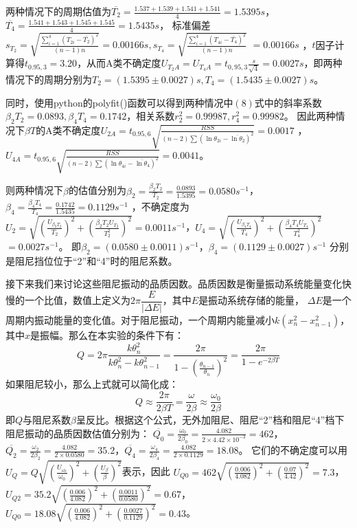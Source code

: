 \documentclass[11pt,a4paper,UTF8]{ctexart}
\begin{document}
两种情况下的周期估值为$\overline{T_{2}}=\frac{1.537+1.539+1.541+1.541}{4}=1.5395s$，$\overline{T_4}=\frac{1.541+1.543+1.545+1.545}{4}=1.5435s$，
标准偏差$s_{T_2}=\sqrt{\frac{\sum_{i=1}^{4}\left(T_{2i}-\overline{T_{2}}\right)^{2}}{(n-1)n}}=0.00166s,s_{T_4}=\sqrt{\frac{\sum_{i=1}^{4}\left(T_{4i}-\overline{T_{4}}\right)^{2}}{(n-1)n}}$ $=0.00166s$
，$t$因子计算得$t_{0.95,3}=3.20$，从而A类不确定度$U_{T_2A}=U_{T_4A}=t_{0,95,3}\frac{s}{\sqrt{4}}=0.0027s$，即两种情况下的周期分别为$T_2=(1.5395\pm0.0027)s,T_4=(1.5435\pm0.0027)s$。

同时，使用python的polyfit()函数可以得到两种情况中$(8)$式中的斜率系数$\beta_2 T_2=0.0893,\beta_4 T_4=0.1742$，相关系数$r_2^2=0.99987,r_4^2=0.99982$。
因此两种情况下$\beta T$的A类不确定度$U_{2A}=t_{0.95,6}\sqrt{\frac{RSS}{(n-2)\sum\left(\ln\theta_{2i}-\overline{\ln\theta_2}\right)^{2}}}=0.0017$
，$U_{4A}=t_{0.95,6}\sqrt{\frac{RSS}{(n-2)\sum\left(\ln\theta_{4i}-\overline{\ln\theta_4}\right)^{2}}}=0.0041$。

则两种情况下$\beta$的估值分别为$\beta_2=\frac{\beta_2 T_2}{T_2}=\frac{0.0893}{1.5395}=0.0580 s^{-1}$，$\beta_4=\frac{\beta_4 T_4}{T_4}=\frac{0.1742}{1.5435}=0.1129 s^{-1}$
，不确定度为$U_{2}=\sqrt{(\frac{U_{\beta_2 T_2}}{T_2})^2+(\frac{\beta_2 T_2U_{T_2}}{T_2^2})^2}=0.0011s^{-1}$，$U_{4}=\sqrt{(\frac{U_{\beta_4 T_4}}{T_4})^2+(\frac{\beta_4 T_4U_{T_4}}{T_4^2})^2}$ $=0.0027s^{-1}$。
即$\boxed{\beta_2=(0.0580\pm0.0011)s^{-1}}$，$\boxed{\beta_4=(0.1129\pm0.0027)s^{-1}}$ 分别是阻尼挡位位于“2”和“4”时的阻尼系数。

接下来我们来讨论这些阻尼振动的品质因数。品质因数是衡量振动系统能量变化快慢的一个比值，数值上定义为$2\pi\dfrac{E}{|\Delta E|}$，其中$E$是振动系统存储的能量，
$\Delta E$是一个周期内振动能量的变化值。对于阻尼振动，一个周期内能量减小$k(x_n^2-x_{n-1}^2)$，其中$x$是振幅。那么在本实验的条件下有：
	\[Q=2\pi\frac{k\theta_n^2}{k\theta_n^2-k\theta_{n-1}^2}=\frac{2\pi}{1-(\frac{\theta_{n-1}}{\theta_n})^2}=\frac{2\pi}{1-e^{-2\beta T}}\tag{10}\]
如果阻尼较小，那么上式就可以简化成：
	\[Q\approx\frac{2\pi}{2\beta T}=\frac{\omega}{2\beta}\approx\frac{\omega_0}{2\beta}\tag{11}\]
即$Q$与阻尼系数$\beta$呈反比。根据这个公式，无外加阻尼、阻尼“2”档和阻尼“4”档下阻尼振动的品质因数估值分别为：
$\overline{Q_0}=\frac{\omega_0}{2\beta_0}=\frac{4.082}{2\times4.42\times10^{-3}}=462$，$\overline{Q_2}=\frac{\omega_2}{2\beta_2}=\frac{4.082}{2\times0.0580}=35.2$，$\overline{Q_4}=\frac{\omega_4}{2\beta_4}=\frac{4.082}{2\times0.1129}=18.08$。
它们的不确定度可以用$U_Q=Q\sqrt{(\frac{U_{\omega_0}}{\omega_0})^2+(\frac{U_{\beta}}{\beta})^2}$表示，因此
$U_{Q0}=462\sqrt{(\frac{0.006}{4.082})^2+(\frac{0.07}{4.42})^2}=7.3$，$U_{Q2}=35.2\sqrt{(\frac{0.006}{4.082})^2+(\frac{0.0011}{0.0580})^2}=0.67$，$U_{Q0}=18.08\sqrt{(\frac{0.006}{4.082})^2+(\frac{0.0027}{0.1129})^2}=0.43$。
\end{document}
